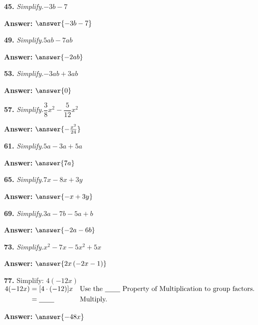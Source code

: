 \documentclass{ximera}
\begin{document}
\begin{problem}
\textbf{45.} \emph{Simplify.}\quad $-3b - 7$

\textbf{Answer:} $\answer{-3b -7}$
\end{problem}

\begin{problem}
\textbf{49.} \emph{Simplify.}\quad $5ab - 7ab$

\textbf{Answer:} $\answer{-2ab}$
\end{problem}

\begin{problem}
\textbf{53.} \emph{Simplify.}\quad $-3ab + 3ab$

\textbf{Answer:} $\answer{0}$
\end{problem}

\begin{problem}
\textbf{57.} \emph{Simplify.}\quad $\dfrac{3}{8}x^2 - \dfrac{5}{12}x^2$

\textbf{Answer:} $\answer{- \frac{x^{2}}{24}}$
\end{problem}

\begin{problem}
\textbf{61.} \emph{Simplify.}\quad $5a - 3a + 5a$

\textbf{Answer:} $\answer{7a}$
\end{problem}

\begin{problem}
\textbf{65.} \emph{Simplify.}\quad $7x - 8x + 3y$

\textbf{Answer:} $\answer{-x +3y}$
\end{problem}

\begin{problem}
\textbf{69.} \emph{Simplify.}\quad $3a - 7b - 5a + b$

\textbf{Answer:} $\answer{-2a -6b}$
\end{problem}

\begin{problem}
\textbf{73.} \emph{Simplify.}\quad $x^2 - 7x - 5x^2 + 5x$

\textbf{Answer:} $\answer{2x\left(-2x -1\right)}$
\end{problem}

\begin{problem}
\textbf{77.} Simplify: $4(-12x)$
  \\[2pt]
  \hspace*{1.5em}$\begin{aligned}
    4(-12x) &= [4 \cdot (-12)]x && \text{Use the \underline{\hspace{2.2em}} Property of Multiplication
                                        to group factors.}\\
            &= \underline{\hspace{2.2em}} && \text{Multiply.}
  \end{aligned}$

\textbf{Answer:} $\answer{-48x}$
\end{problem}
\end{document}
